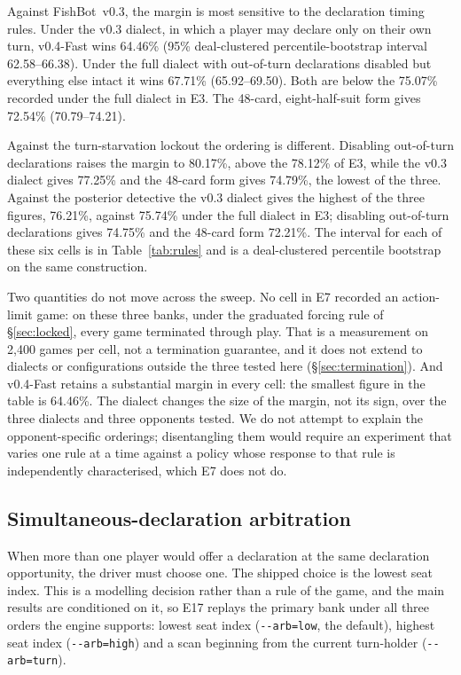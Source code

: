\documentclass[11pt]{article}
\theoremstyle{definition}
\DeclareRobustCommand{\vfast}{\texorpdfstring{\mbox{v0.4-Fast}}{v0.4-Fast}}
\DeclareRobustCommand{\vthree}{\texorpdfstring{\mbox{FishBot v0.3}}{FishBot v0.3}}
\newcommand{\numVsVthree}{75.07}
\newcommand{\numVsLockout}{78.12}
\newcommand{\numVsDetective}{75.74}
\newcommand{\numEsevenGames}{2{,}400}
\newcommand{\numEsevenVthreeLegacy}{64.46}
\newcommand{\numEsevenVthreeLegacyCI}{62.58--66.38}
\newcommand{\numEsevenVthreeEight}{72.54}
\newcommand{\numEsevenVthreeEightCI}{70.79--74.21}
\newcommand{\numEsevenVthreeNoOOT}{67.71}
\newcommand{\numEsevenVthreeNoOOTCI}{65.92--69.50}
\newcommand{\numEsevenLockoutLegacy}{77.25}
\newcommand{\numEsevenLockoutEight}{74.79}
\newcommand{\numEsevenLockoutNoOOT}{80.17}
\newcommand{\numEsevenDetectiveLegacy}{76.21}
\newcommand{\numEsevenDetectiveEight}{72.21}
\newcommand{\numEsevenDetectiveNoOOT}{74.75}
\begin{document}
Against \vthree{}, the margin is most sensitive to the declaration timing rules.
Under the v0.3 dialect, in which a player may declare only on their own turn,
\vfast{} wins \numEsevenVthreeLegacy\% (95\% deal-clustered percentile-bootstrap
interval \numEsevenVthreeLegacyCI). Under the full dialect with out-of-turn
declarations disabled but everything else intact it wins
\numEsevenVthreeNoOOT\% (\numEsevenVthreeNoOOTCI). Both are below the
\numVsVthree\% recorded under the full dialect in E3. The 48-card,
eight-half-suit form gives \numEsevenVthreeEight\% (\numEsevenVthreeEightCI).

Against the turn-starvation lockout the ordering is different. Disabling
out-of-turn declarations raises the margin to \numEsevenLockoutNoOOT\%, above
the \numVsLockout\% of E3, while the v0.3 dialect gives
\numEsevenLockoutLegacy\% and the 48-card form gives \numEsevenLockoutEight\%,
the lowest of the three. Against the posterior detective the v0.3 dialect gives
the highest of the three figures, \numEsevenDetectiveLegacy\%, against
\numVsDetective\% under the full dialect in E3; disabling out-of-turn
declarations gives \numEsevenDetectiveNoOOT\% and the 48-card form
\numEsevenDetectiveEight\%. The interval for each of these six cells is in
Table~\ref{tab:rules} and is a deal-clustered percentile bootstrap on the same
construction.

Two quantities do not move across the sweep. No cell in E7 recorded an
action-limit game: on these three banks, under the graduated forcing rule of
\S\ref{sec:locked}, every game terminated through play. That is a measurement on
\numEsevenGames{} games per cell, not a termination guarantee, and it does not
extend to dialects or configurations outside the three tested here
(\S\ref{sec:termination}). And \vfast{} retains a substantial margin in every
cell: the smallest figure in the table is \numEsevenVthreeLegacy\%. The dialect
changes the size of the margin, not its sign, over the three dialects and three
opponents tested. We do not attempt to explain the opponent-specific orderings;
disentangling them would require an experiment that varies one rule at a time
against a policy whose response to that rule is independently characterised,
which E7 does not do.

\subsection{Simultaneous-declaration arbitration}
\label{app:dialects-arb}

When more than one player would offer a declaration at the same declaration
opportunity, the driver must choose one. The shipped choice is the lowest seat
index. This is a modelling decision rather than a rule of the game, and the
main results are conditioned on it, so E17 replays the primary bank under all
three orders the engine supports: lowest seat index (\texttt{-{}-arb=low}, the
default), highest seat index (\texttt{-{}-arb=high}) and a scan beginning from
the current turn-holder (\texttt{-{}-arb=turn}).
\end{document}

